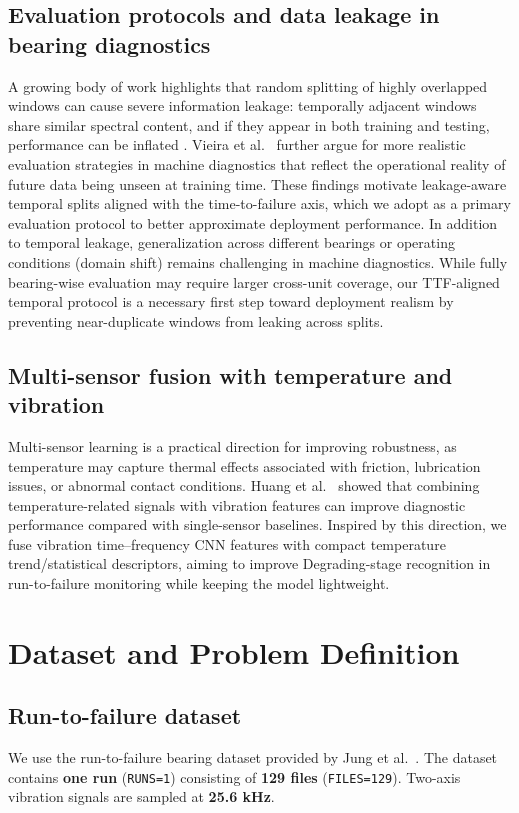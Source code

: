 \subsection{Evaluation protocols and data leakage in bearing diagnostics}
A growing body of work highlights that random splitting of highly overlapped windows can cause severe information leakage: temporally adjacent windows share similar spectral content, and if they appear in both training and testing, performance can be inflated \cite{wheat2024leakage}. Vieira et al.~\cite{vieira2024realistic} further argue for more realistic evaluation strategies in machine diagnostics that reflect the operational reality of future data being unseen at training time. These findings motivate leakage-aware temporal splits aligned with the time-to-failure axis, which we adopt as a primary evaluation protocol to better approximate deployment performance.
In addition to temporal leakage, generalization across different bearings or operating conditions (domain shift) remains challenging in machine diagnostics. While fully bearing-wise evaluation may require larger cross-unit coverage, our TTF-aligned temporal protocol is a necessary first step toward deployment realism by preventing near-duplicate windows from leaking across splits.
\subsection{Multi-sensor fusion with temperature and vibration}
Multi-sensor learning is a practical direction for improving robustness, as temperature may capture thermal effects associated with friction, lubrication issues, or abnormal contact conditions. Huang et al.~\cite{huang2023esrel_tempvib} showed that combining temperature-related signals with vibration features can improve diagnostic performance compared with single-sensor baselines. Inspired by this direction, we fuse vibration time--frequency CNN features with compact temperature trend/statistical descriptors, aiming to improve Degrading-stage recognition in run-to-failure monitoring while keeping the model lightweight.

\section{Dataset and Problem Definition}
\label{sec:data_problem}

\subsection{Run-to-failure dataset}
We use the run-to-failure bearing dataset provided by Jung et al.~\cite{jung2024dib_rtf,jung2024mendeley_rtf}. 
The dataset contains \textbf{one run} (\texttt{RUNS=1}) consisting of \textbf{129 files} (\texttt{FILES=129}). 
Two-axis vibration signals are sampled at \textbf{25.6 kHz}.

